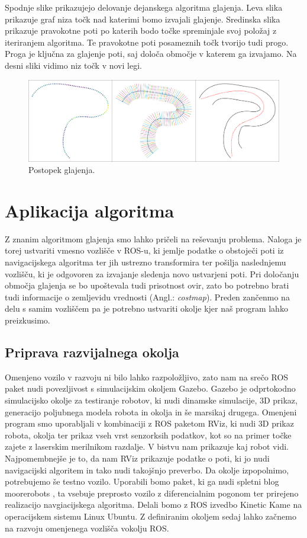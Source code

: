 \documentclass[10pt,a4paper]{article}
\begin{document}
Spodnje slike prikazujejo delovanje dejanskega algoritma glajenja. Leva slika prikazuje graf niza točk nad katerimi bomo  izvajali glajenje. Sredinska slika prikazuje pravokotne poti po katerih bodo točke spreminjale svoj položaj z iteriranjem algoritma. Te pravokotne poti posameznih točk tvorijo tudi progo. Proga je ključna za glajenje poti, saj določa območje v katerem ga izvajamo. Na desni sliki vidimo niz točk v novi legi.

\begin{figure}[H]
	\centering
	\includegraphics[width=15cm]{pic/slika6.png}
	\caption{Postopek glajenja.}
	\label{fig:slika}
\end{figure}

\section{Aplikacija algoritma}

Z znanim algoritmom glajenja smo lahko pričeli na reševanju problema. Naloga je torej ustvariti vmesno vozlišče v ROS-u, ki jemlje podatke o obstoječi poti iz navigacijskega algoritma ter jih ustrezno transformira ter pošilja naslednjemu vozlišču, ki je odgovoren za izvajanje sledenja novo ustvarjeni poti. Pri določanju območja glajenja se bo upoštevala tudi prisotnost ovir, zato bo potrebno brati tudi informacije o zemljevidu vrednosti (Angl.: \textit{costmap}). Preden zančenmo na delu s samim vozliščem pa je potrebno ustvariti okolje kjer naš program lahko preizkusimo.

\subsection{Priprava razvijalnega okolja}

Omenjeno vozilo v razvoju ni bilo lahko razpoložljivo, zato nam na srečo ROS paket nudi povezljivost s simulacijskim okoljem Gazebo. Gazebo je odprtokodno simulacijsko okolje za testiranje robotov, ki nudi dinamske simulacije, 3D prikaz, generacijo poljubnega modela robota in okolja in še marsikaj drugega. Omenjeni program smo uporabljali v kombinaciji z ROS paketom RViz, ki nudi 3D prikaz robota, okolja ter prikaz vseh vrst senzorksih podatkov, kot so na primer točke zajete z laserskim merilnikom razdalje. V bistvu nam prikazuje kaj robot vidi. Najpomembnejše je to, da nam RViz prikazuje podatke o poti, ki jo nudi navigacijski algoritem in tako nudi takojšnjo preverbo. Da okolje izpopolnimo, potrebujemo še testno vozilo. Uporabili bomo paket, ki ga nudi spletni blog moorerobots \cite{vir10}, ta vsebuje preprosto vozilo z diferencialnim pogonom ter prirejeno realizacijo navgiacijskega algoritma. Delali bomo z ROS izvedbo Kinetic Kame na operacijskem sistemu Linux Ubuntu. Z definiranim okoljem sedaj lahko začnemo na razvoju omenjenega vozlišča vokolju ROS.
\end{document}

